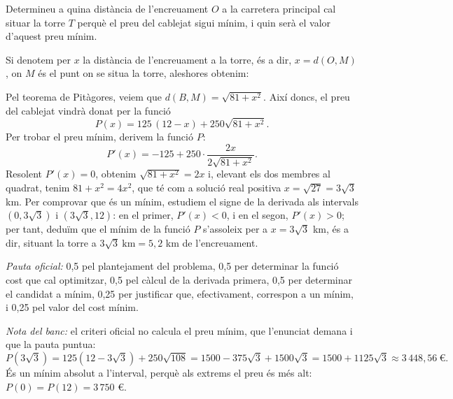 \begin{apartats}

Determineu a quina distància de l'encreuament $O$ a la carretera principal cal situar la torre $T$ perquè el preu del
cablejat sigui mínim, i quin serà el valor d'aquest preu mínim.

\begin{solucio}
Si denotem per $x$ la distància de l'encreuament a la torre, és a dir, $x=d(O,M)$, on $M$ és el punt on se situa la
torre, aleshores obtenim:
\begin{center}
\end{center}
Pel teorema de Pitàgores, veiem que $d(B,M)=\sqrt{81+x^2}$. Així doncs, el preu del cablejat vindrà donat per la
funció
\[
P(x)=125\,(12-x)+250\sqrt{81+x^2}.
\]
Per trobar el preu mínim, derivem la funció $P$:
\[
P'(x)=-125+250\cdot\frac{2x}{2\sqrt{81+x^2}}.
\]
Resolent $P'(x)=0$, obtenim $\sqrt{81+x^2}=2x$ i, elevant els dos membres al quadrat, tenim $81+x^2=4x^2$, que té com a
solució real positiva $x=\sqrt{27}=3\sqrt3$ km. Per comprovar que és un mínim, estudiem el signe de la derivada als
intervals $\left(0,3\sqrt3\right)$ i $\left(3\sqrt3,12\right)$: en el primer, $P'(x)<0$, i en el segon, $P'(x)>0$; per
tant, deduïm que el mínim de la funció $P$ s'assoleix per a $x=3\sqrt3$ km, és a dir, situant la torre a
$3\sqrt3\ \text{km}=5{,}2$ km de l'encreuament.

\textit{Pauta oficial:} 0,5 pel plantejament del problema, 0,5 per determinar la funció cost que cal optimitzar,
0,5 pel càlcul de la derivada primera, 0,5 per determinar el candidat a mínim, 0,25 per justificar que,
efectivament, correspon a un mínim, i 0,25 pel valor del cost mínim.

\textit{Nota del banc:} el criteri oficial no calcula el preu mínim, que l'enunciat demana i que la pauta puntua:
\[
P\!\left(3\sqrt3\right)=125\left(12-3\sqrt3\right)+250\sqrt{108}=1500-375\sqrt3+1500\sqrt3=1500+1125\sqrt3\approx3\,448{,}56\ \text{€}.
\]
És un mínim absolut a l'interval, perquè als extrems el preu és més alt: $P(0)=P(12)=3\,750$ €.
\end{solucio}

\end{apartats}
